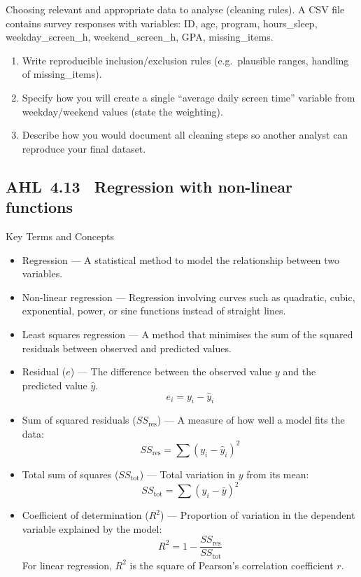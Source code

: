 \documentclass[11pt]{article}
\def\textbf#1{#1}%
\newcommand{\tocsubsection}[1]{\subsection{#1}}
\newcounter{question}
\begin{document}
\begin{question}
\textbf{Choosing relevant and appropriate data to analyse (cleaning rules).}
A CSV file contains survey responses with variables: ID, age, program, hours\_sleep, weekday\_screen\_h, weekend\_screen\_h, GPA, missing\_items.
\begin{enumerate}
  \item Write reproducible inclusion/exclusion rules (e.g.\ plausible ranges, handling of missing\_items).
  \item Specify how you will create a single “average daily screen time” variable from weekday/weekend values (state the weighting).
  \item Describe how you would document all cleaning steps so another analyst can reproduce your final dataset.
\end{enumerate}
\end{question}
\tocsubsection{AHL 4.13 \; Regression with non-linear functions}


\textbf{Key Terms and Concepts}
\begin{itemize}
    \item \textbf{Regression} — A statistical method to model the relationship between two variables.
    \item \textbf{Non-linear regression} — Regression involving curves such as quadratic, cubic, exponential, power, or sine functions instead of straight lines.
    \item \textbf{Least squares regression} — A method that minimises the sum of the squared residuals between observed and predicted values.
    \item \textbf{Residual ($e$)} — The difference between the observed value $y$ and the predicted value $\hat{y}$.
    \[
    e_i = y_i - \hat{y}_i
    \]
    \item \textbf{Sum of squared residuals ($SS_{\text{res}}$)} — A measure of how well a model fits the data:
    \[
    SS_{\text{res}} = \sum (y_i - \hat{y}_i)^2
    \]
    \item \textbf{Total sum of squares ($SS_{\text{tot}}$)} — Total variation in $y$ from its mean:
    \[
    SS_{\text{tot}} = \sum (y_i - \bar{y})^2
    \]
    \item \textbf{Coefficient of determination ($R^2$)} — Proportion of variation in the dependent variable explained by the model:
    \[
    R^2 = 1 - \frac{SS_{\text{res}}}{SS_{\text{tot}}}
    \]
    For linear regression, $R^2$ is the square of Pearson's correlation coefficient $r$.
\end{itemize}
\end{document}
